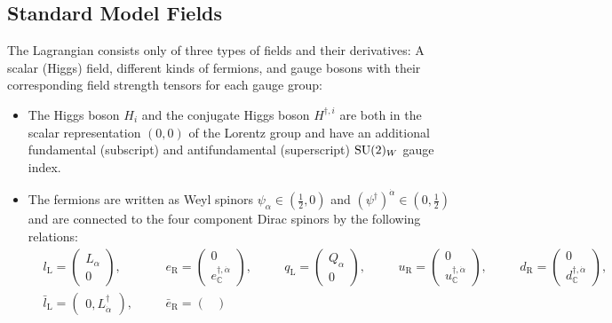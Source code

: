 \subsection{Standard Model Fields} \label{subsec:smFields}
The \sm{} Lagrangian consists only of three types of fields and their derivatives: A scalar (Higgs) field, different kinds of fermions, and gauge bosons with their corresponding field strength tensors for each gauge group:
\begin{itemize}
	\item The Higgs boson $ H_{i} $ and the conjugate Higgs boson $ H^{\dagger, i} $ are both in the scalar representation $ (0,0) $ of the Lorentz group and have an additional fundamental (subscript) and antifundamental (superscript) $ \mathrm{SU}( 2 )_{W} $ gauge index.
	\item The fermions are written as Weyl spinors $ \psi_{\alpha} \in (\frac{1}{2}, 0) $ and $ (\psi^{\dagger})^{\dot{\alpha}} \in (0, \frac{1}{2}) $ and are connected to the four component Dirac spinors by the following relations:
	\begin{equation}
		\boxed{
			\begin{alignedat}{5}
				&l_{\mathrm{L}} = \begin{pmatrix}
					L_{\alpha} \\
					0
				\end{pmatrix}, \quad
				&&e_{\mathrm{R}} = \begin{pmatrix}
					0 \\
					e_{\mathbb{C}}^{\dagger, \dot{\alpha}}
				\end{pmatrix}, \quad
				&&q_{\mathrm{L}} = \begin{pmatrix}
					Q_{\alpha} \\
					0
				\end{pmatrix}, \quad
				&&u_{\mathrm{R}} = \begin{pmatrix}
					0 \\
					u_{\mathbb{C}}^{\dagger, \dot{\alpha}}
				\end{pmatrix}, \quad
				&&d_{\mathrm{R}} = \begin{pmatrix}
					0 \\
					d_{\mathbb{C}}^{\dagger, \dot{\alpha}}
				\end{pmatrix}, \\[1.5ex]
				&\bar{l}_{\mathrm{L}} = \begin{pmatrix}
					0, L^{\dagger}_{\dot{\alpha}}
				\end{pmatrix}, \quad
				&&\bar{e}_{\mathrm{R}} = \begin{pmatrix}

\end{pmatrix}
\end{alignedat}}
\end{equation}
\end{itemize}
